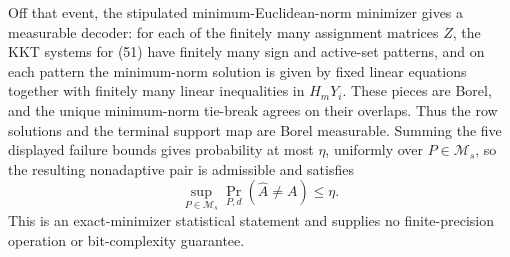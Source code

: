 Off that event, the stipulated minimum-Euclidean-norm minimizer gives a measurable decoder: for each of the finitely many assignment matrices \(Z\), the KKT systems for (51) have finitely many sign and active-set patterns, and on each pattern the minimum-norm solution is given by fixed linear equations together with finitely many linear inequalities in \(H_mY_i\).  These pieces are Borel, and the unique minimum-norm tie-break agrees on their overlaps.  Thus the row solutions and the terminal support map are Borel measurable.  Summing the five displayed failure bounds gives probability at most \(\eta\), uniformly over \(P\in\mathcal M_s\), so the resulting nonadaptive pair is admissible and satisfies
\[
 \sup_{P\in\mathcal M_s}\Pr_{P,d}(\widehat A\ne A)\le\eta.
\]
This is an exact-minimizer statistical statement and supplies no finite-precision operation or bit-complexity guarantee.